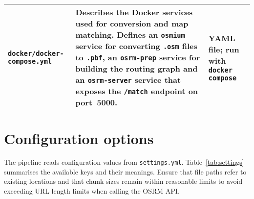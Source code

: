 \documentclass[12pt,a4paper]{article}
\begin{document}
\begin{longtable}{@{}p{3cm}p{8cm}p{4cm}@{}}
	\texttt{docker/docker-compose.yml}                                       & Describes the Docker services used for
	conversion and map matching.  Defines an \texttt{osmium} service for
	converting \texttt{.osm} files to \texttt{.pbf}, an \texttt{osrm-prep}
	service for building the routing graph and an \texttt{osrm-server} service
	that exposes the \texttt{/match} endpoint on port~5000.                  & YAML file; run
	with \texttt{docker compose}                                                                                                                                                \\
	\bottomrule
\end{longtable}

\section{Configuration options}
The pipeline reads configuration values from \texttt{settings.yml}.  Table~\ref{tab:settings}
summarises the available keys and their meanings.  Ensure that file paths
refer to existing locations and that chunk sizes remain within reasonable
limits to avoid exceeding URL length limits when calling the OSRM API.
\end{document}
